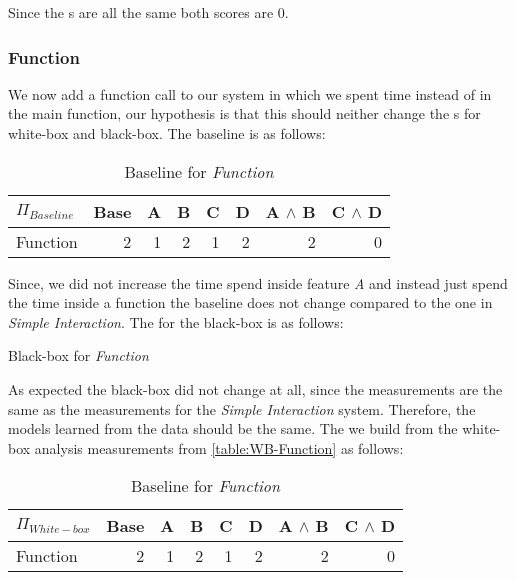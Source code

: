 Since the {\perfInfluenceModel}s are all the same both scores are 0.

\subsubsection*{Function}
We now add a function call to our system in which we spent time instead of in the main function, our hypothesis is that this should neither
change the {\perfInfluenceModel}s for white-box and black-box. The baseline {\perfInfluenceModel} is as follows:

\begin{table}[H]
    \centering
    \begin{tabular}{lrrrrrrr}
    \toprule
    $\Pi_{Baseline}$    & Base & A & B & C & D & A $\land$ B & C $\land$ D  \\
    \midrule
    Function &   2 &  1 &  2 &  1 &  2 &   2 &  0 \\
    \bottomrule
    \end{tabular}
    \caption{Baseline {\perfInfluenceModel} for \emph{Function}}
\end{table}

Since, we did not increase the time spend inside feature \emph{A} and instead just spend the time inside a function the baseline 
{\perfInfluenceModel} does not change compared to the one in \emph{Simple Interaction}. The {\perfInfluenceModel} for 
the black-box is as follows: 

\begin{table}[H]
    \centering
    
    \caption{Black-box {\perfInfluenceModel} for \emph{Function}}
\end{table}

As expected the black-box {\perfInfluenceModel} did not change at all, since the measurements are the same as the measurements
for the \emph{Simple Interaction} system. Therefore, the models learned from the data should be the same. 
The {\perfInfluenceModel} we build from the white-box analysis measurements from \autoref{table:WB-Function} as follows:

\begin{table}[H]
    \centering
    \begin{tabular}{lrrrrrrr}
    \toprule
    $\Pi_{White-box}$    & Base & A & B & C & D & A $\land$ B & C $\land$ D  \\
    \midrule
    Function &   2 &  1 &  2 &  1 &  2 &   2 &  0 \\
    \bottomrule
    \end{tabular}
    \caption{Baseline {\perfInfluenceModel} for \emph{Function}}
\end{table}

